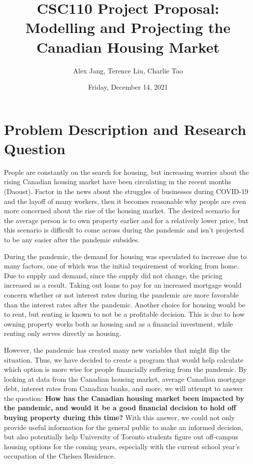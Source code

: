 \documentclass[fontsize=11pt]{article}
\title{CSC110 Project Proposal: Modelling and Projecting the Canadian Housing Market}
\author{Alex Jang, Terence Liu, Charlie Tao}
\date{Friday, December 14, 2021}
\begin{document}
\maketitle

\section*{Problem Description and Research Question}

People are constantly on the search for housing, but increasing worries about the rising Canadian housing market have been circulating in the recent months (Daoust). Factor in the news about the struggles of businesses during COVID-19 and the layoff of many workers, then it becomes reasonable why people are even more concerned about the rise of the housing market. The desired scenario for the average person is to own property earlier and for a relatively lower price, but this scenario is difficult to come across during the pandemic and isn't projected to be any easier after the pandemic subsides.

During the pandemic, the demand for housing was speculated to increase due to many factors, one of which was the initial requirement of working from home. Due to supply and demand, since the supply did not change, the pricing increased as a result. Taking out loans to pay for an increased mortgage would concern whether or not interest rates during the pandemic are more favorable than the interest rates after the pandemic. Another choice for housing would be to rent, but renting is known to not be a profitable decision. This is due to how owning property works both as housing and as a financial investment, while renting only serves directly as housing.

However, the pandemic has created many new variables that might flip the situation. Thus, we have decided to create a program that would help calculate which option is more wise for people financially suffering from the pandemic. By looking at data from the Canadian housing market, average Canadian mortgage debt, interest rates from Canadian banks, and more, we will attempt to answer the question: \textbf{How has the Canadian housing market been impacted by the pandemic, and would it be a good financial decision to hold off buying property during this time?} With this answer, we could not only provide useful information for the general public to make an informed decision, but also potentially help University of Toronto students figure out off-campus housing options for the coming years, especially with the current school year's occupation of the Chelsea Residence.
\end{document}
